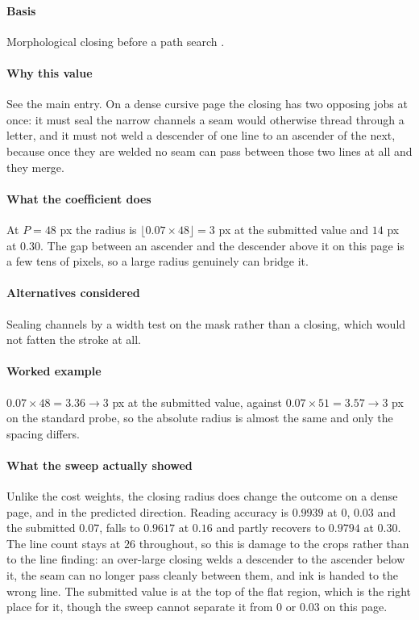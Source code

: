 \paragraph{Basis}

Morphological closing before a path search \cite{haralick1987}.

\paragraph{Why this value}

See the main entry. On a dense cursive page the closing has two opposing jobs at once: it must seal the narrow channels a seam would otherwise thread through a letter, and it must not weld a descender of one line to an ascender of the next, because once they are welded no seam can pass between those two lines at all and they merge.

\paragraph{What the coefficient does}

At $P = 48$ px the radius is $\lfloor 0.07 \times 48 \rfloor = 3$ px at the submitted value and $14$ px at $0.30$. The gap between an ascender and the descender above it on this page is a few tens of pixels, so a large radius genuinely can bridge it.

\paragraph{Alternatives considered}

Sealing channels by a width test on the mask rather than a closing, which would not fatten the stroke at all.

\paragraph{Worked example}

$0.07 \times 48 = 3.36 \to 3$ px at the submitted value, against $0.07 \times 51 = 3.57 \to 3$ px on the standard probe, so the absolute radius is almost the same and only the spacing differs.

\paragraph{What the sweep actually showed}

Unlike the cost weights, the closing radius does change the outcome on a dense page, and in the predicted direction. Reading accuracy is $0.9939$ at $0$, $0.03$ and the submitted $0.07$, falls to $0.9617$ at $0.16$ and partly recovers to $0.9794$ at $0.30$. The line count stays at $26$ throughout, so this is damage to the crops rather than to the line finding: an over-large closing welds a descender to the ascender below it, the seam can no longer pass cleanly between them, and ink is handed to the wrong line. The submitted value is at the top of the flat region, which is the right place for it, though the sweep cannot separate it from $0$ or $0.03$ on this page.

